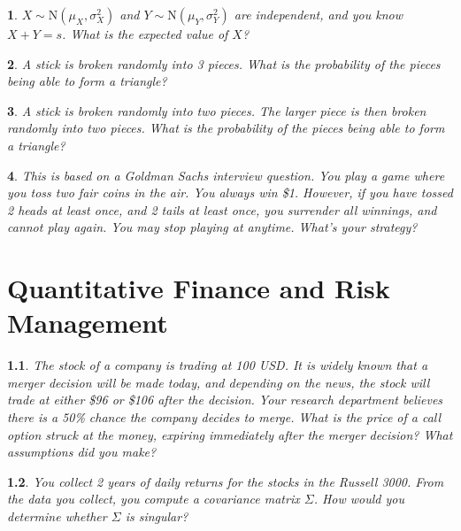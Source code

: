 \documentclass{report}
\newtheorem{problem}{}
\numberwithin{problem}{chapter} %
\begin{document}
\begin{problem}
$X \sim \mbox{N}(\mu_X, \sigma^2_X)$ and $Y \sim \mbox{N}(\mu_Y, \sigma^2_Y)$ are independent, and you know $X+Y=s$. What is the expected value of $X$? 
\end{problem}

\begin{problem}
A stick is broken randomly into 3 pieces. What is the probability of the pieces being able to form a triangle?
\end{problem}

\begin{problem}
A stick is broken randomly into two pieces. The larger piece is then broken randomly into two pieces. What is the probability of the pieces being able to form a triangle?
\end{problem}

\begin{problem}
This is based on a Goldman Sachs interview question. You play a game where you toss two fair coins in the air. You always win \$1. However, if you have tossed 2 heads at least once, and 2 tails at least once, you surrender all winnings, and cannot play again. You may stop playing at anytime. What's your strategy? 


\end{problem}


\chapter{Quantitative Finance and Risk Management}

\begin{problem}
The stock of a company is trading at 100 USD. It is widely known that a merger decision will be made today, and depending on the news, the stock will trade at either \$96 or \$106 after the decision. Your research department believes there is a 50\% chance
        the company decides to merge. What is the price of a call option struck at the money, expiring immediately after the merger decision? What assumptions did you make?
\end{problem}

\begin{problem}
You collect 2 years of daily returns for the stocks in the Russell 3000. From the data you collect, you compute a covariance matrix $\Sigma$. How would you determine whether $\Sigma$ is singular?
\end{problem}
\end{document}
